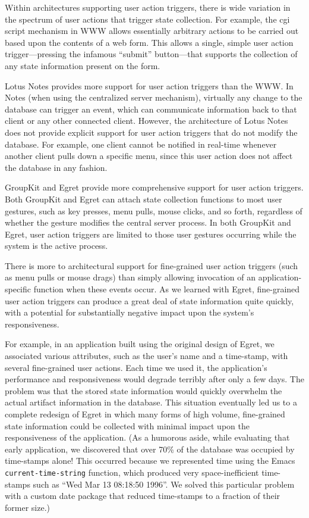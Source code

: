 Within architectures supporting user action triggers, there is wide
variation in the spectrum of user actions that trigger state collection.
For example, the cgi script mechanism in WWW allows essentially arbitrary
actions to be carried out based upon the contents of a web form.  This
allows a single, simple user action trigger---pressing the infamous
``submit'' button---that supports the collection of any state information
present on the form.

Lotus Notes provides more support for user action triggers than the WWW.
In Notes (when using the centralized server mechanism), virtually any
change to the database can trigger an event, which can communicate
information back to that client or any other connected client. However, the
architecture of Lotus Notes does not provide explicit support for user
action triggers that do not modify the database.  For example, one client
cannot be notified in real-time whenever another client pulls down a 
specific menu, since this user action does not affect the database in 
any fashion.

GroupKit and Egret provide more comprehensive support for user action
triggers. Both GroupKit and Egret can attach state collection functions to
most user gestures, such as key presses, menu pulls, mouse clicks, and so
forth, regardless of whether the gesture modifies the central server
process. In both GroupKit and Egret, user action triggers are limited to
those user gestures occurring while the system is the active process.

There is more to architectural support for fine-grained user action
triggers (such as menu pulls or mouse drags) than simply allowing
invocation of an application-specific function when these events occur.  As
we learned with Egret, fine-grained user action triggers can produce a
great deal of state information quite quickly, with a potential for
substantially negative impact upon the system's responsiveness.

For example, in an application built using the original design of Egret, we
associated various attributes, such as the user's name and a time-stamp,
with several fine-grained user actions.  Each time we used it, the
application's performance and responsiveness would degrade terribly after
only a few days.  The problem was that the stored state information would
quickly overwhelm the actual artifact information in the database.
This situation eventually led us to a complete redesign of Egret in which
many forms of high volume, fine-grained state information could be
collected with minimal impact upon the responsiveness of the
application. (As a humorous aside, while evaluating that early application,
we discovered that over 70\% of the database was occupied by time-stamps
alone! This occurred because we represented time using the Emacs {\tt
current-time-string} function, which produced very space-inefficient
time-stamps such as ``Wed Mar 13 08:18:50 1996''. We solved this particular
problem with a custom date package that reduced time-stamps to a fraction
of their former size.)


